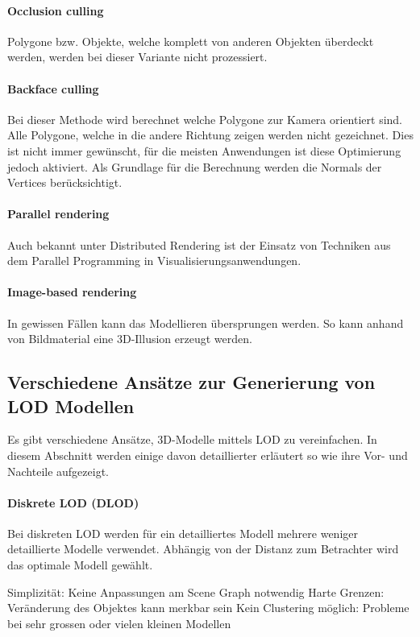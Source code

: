 \paragraph{Occlusion culling}
Polygone bzw. Objekte, welche komplett von anderen Objekten überdeckt werden, werden bei dieser Variante nicht prozessiert.

\paragraph{Backface culling}
\label{chap:backfaceCulling}
Bei dieser Methode wird berechnet welche Polygone zur Kamera orientiert sind.
Alle Polygone, welche in die andere Richtung zeigen werden nicht gezeichnet.
Dies ist nicht immer gewünscht, für die meisten Anwendungen ist diese Optimierung jedoch aktiviert.
Als Grundlage für die Berechnung werden die Normals der Vertices berücksichtigt.

\paragraph{Parallel rendering}
Auch bekannt unter Distributed Rendering ist der Einsatz von Techniken aus dem Parallel Programming in Visualisierungsanwendungen. 

\paragraph{Image-based rendering}
In gewissen Fällen kann das Modellieren übersprungen werden. So kann anhand von Bildmaterial eine 3D-Illusion erzeugt werden.

\subsection{Verschiedene Ansätze zur Generierung von LOD Modellen}
Es gibt verschiedene Ansätze, 3D-Modelle mittels LOD zu vereinfachen. In diesem Abschnitt werden einige davon detaillierter erläutert so wie ihre Vor- und Nachteile aufgezeigt.

\paragraph{Diskrete LOD (DLOD)}
Bei diskreten LOD werden für ein detailliertes Modell mehrere weniger detaillierte Modelle verwendet.
Abhängig von der Distanz zum Betrachter wird das optimale Modell gewählt.
\begin{itemize}
  \pro Simplizität: Keine Anpassungen am Scene Graph notwendig
  \con Harte Grenzen: Veränderung des Objektes kann merkbar sein
  \con Kein Clustering möglich: Probleme bei sehr grossen oder vielen kleinen Modellen
\end{itemize}

